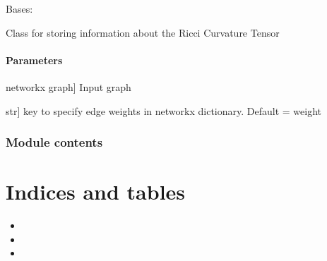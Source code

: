 \documentclass[letterpaper,10pt,english]{sphinxmanual}
\begin{document}
\begin{fulllineitems}
\label{\detokenize{graph_ricci_curvature:graph_ricci_curvature.ricci_curvature.RicciCurvature}}
\pysigstartsignatures
{}
\pysigstopsignatures
\sphinxAtStartPar
Bases: {\hyperref[\detokenize{graph_ricci_curvature:graph_ricci_curvature.graph_metric.GraphMetric}]{}}

\sphinxAtStartPar
Class for storing information about the Ricci Curvature Tensor


\subsubsection{Parameters}
\label{\detokenize{graph_ricci_curvature:id5}}\begin{description}
\sphinxlineitem{G}{[}networkx graph{]}
\sphinxAtStartPar
Input graph

\sphinxlineitem{weight\_key}{[}str{]}
\sphinxAtStartPar
key to specify edge weights in networkx dictionary. Default = weight

\end{description}

\end{fulllineitems}



\subsection{Module contents}
\label{\detokenize{graph_ricci_curvature:module-graph_ricci_curvature}}\label{\detokenize{graph_ricci_curvature:module-contents}}

\chapter{Indices and tables}
\label{\detokenize{index:indices-and-tables}}\begin{itemize}
\item {} 
\sphinxAtStartPar
{}

\item {} 
\sphinxAtStartPar
{}

\item {} 
\sphinxAtStartPar
{}

\end{itemize}
\end{document}
